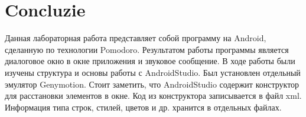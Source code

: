 \section*{Concluzie}
{}
Данная лабораторная работа представляет собой программу на Android, сделанную по технологии Pomodoro. Результатом работы программы является диалоговое окно в окне приложения и звуковое сообщение. В ходе работы были изучены структура и основы работы с AndroidStudio. Был установлен отдельный эмулятор Genymotion. Стоит заметить, что AndroidStudio содержит конструктор для расстановки элементов в окне. Код из конструктора записывается в файл xml. Информация типа строк, стилей, цветов и др. хранится в отдельных файлах.

\clearpage